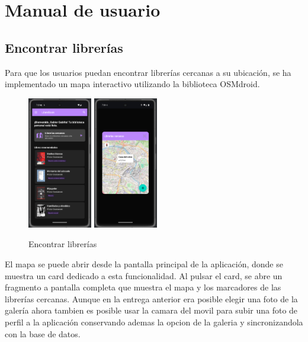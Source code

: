 \documentclass[a4paper,11pt]{report}
\begin{document}
  \chapter{Manual de usuario}
    \section{Encontrar librerías}
      Para que los usuarios puedan encontrar librerías cercanas a su ubicación, se ha implementado un mapa interactivo utilizando la biblioteca OSMdroid.
      \begin{figure}[H]
        \centering
        \includegraphics[width=0.25\textwidth]{.img/mapa_boton.png}
        \hspace{2cm}
        \includegraphics[width=0.25\textwidth]{.img/mapa_fragment.png}
        \caption{Encontrar librerías}
        \label{fig:mapa}
      \end{figure}
      El mapa se puede abrir desde la pantalla principal de la aplicación, donde se muestra un card dedicado a esta funcionalidad.
      Al pulsar el card, se abre un fragmento a pantalla completa que muestra el mapa y los marcadores de las librerías cercanas.
      Aunque en la entrega anterior era posible elegir una foto de la galería ahora tambien es posible usar la camara del movil para subir una foto de perfil a la aplicación conservando ademas la opcion de la galeria y sincronizandola con la base de datos.
\end{document}
